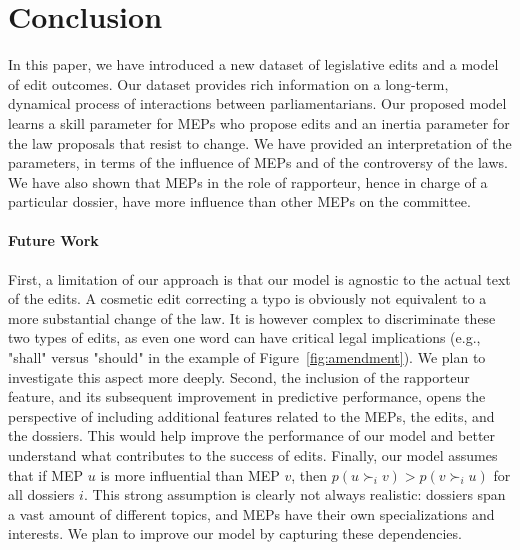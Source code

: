 \section{Conclusion}
\label{sec:conclusion}

In this paper, we have introduced a new dataset of legislative edits and a model of edit outcomes.
Our dataset provides rich information on a long-term, dynamical process of interactions between parliamentarians.
Our proposed model learns a skill parameter for MEPs who propose edits and an inertia parameter for the law proposals that resist to change.
We have provided an interpretation of the parameters, in terms of the influence of MEPs and of the controversy of the laws.
We have also shown that MEPs in the role of rapporteur, hence in charge of a particular dossier, have more influence than other MEPs on the committee.

\paragraph{Future Work}
First, a limitation of our approach is that our model is agnostic to the actual text of the edits.
A cosmetic edit correcting a typo is obviously not equivalent to a more substantial change of the law.
It is however complex to discriminate these two types of edits, as even one word can have critical legal implications (e.g., "shall" versus "should" in the example of Figure~\ref{fig:amendment}).
We plan to investigate this aspect more deeply.
Second, the inclusion of the rapporteur feature, and its subsequent improvement in predictive performance, opens the perspective of including additional features related to the MEPs, the edits, and the dossiers.
This would help improve the performance of our model and better understand what contributes to the success of edits.
Finally, our model assumes that if MEP $u$ is more influential than MEP $v$, then $ p( u \succ_i v ) > p( v \succ_i u ) $ for all dossiers $i$.
This strong assumption is clearly not always realistic: dossiers span a vast amount of different topics, and MEPs have their own specializations and interests.
We plan to improve our model by capturing these dependencies.

